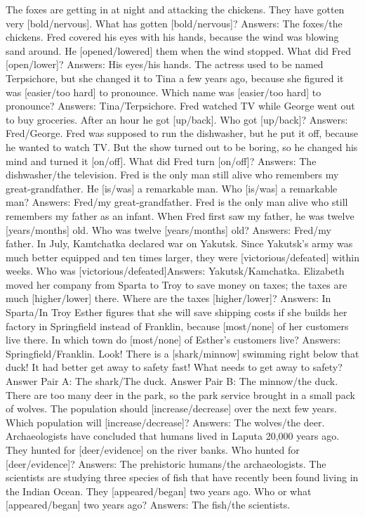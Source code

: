 \begin{foo}
The foxes are getting in at night and attacking the chickens. They have gotten very [bold/nervous]. What has gotten [bold/nervous]? Answers: The foxes/the chickens.
Fred covered his eyes with his hands, because the wind was blowing sand around. He [opened/lowered] them when the wind stopped. What did Fred [open/lower]? Answers: His eyes/his hands.
The actress used to be named Terpsichore, but she changed it to Tina a few years ago, because she figured it was [easier/too hard] to pronounce. Which name was [easier/too hard] to pronounce? Answers: Tina/Terpsichore.
Fred watched TV while George went out to buy groceries. After an hour he got [up/back]. Who got [up/back]? Answers: Fred/George.
Fred was supposed to run the dishwasher, but he put it off, because he wanted to watch TV. But the show turned out to be boring, so he changed his mind and turned it [on/off]. What did Fred turn [on/off]? Answers: The dishwasher/the television.
Fred is the only man still alive who remembers my great-grandfather. He [is/was] a remarkable man. Who [is/was] a remarkable man? Answers: Fred/my great-grandfather.
Fred is the only man alive who still remembers my father as an infant. When Fred first saw my father, he was twelve [years/months] old. Who was twelve [years/months] old? Answers: Fred/my father.
In July, Kamtchatka declared war on Yakutsk. Since Yakutsk's army was much better equipped and ten times larger, they were [victorious/defeated] within weeks. Who was [victorious/defeated]Answers:  Yakutsk/Kamchatka.
Elizabeth moved her company from Sparta to Troy to save money on taxes; the taxes are much [higher/lower] there. Where are the taxes [higher/lower]? Answers: In Sparta/In Troy
Esther figures that she will save shipping costs if she builds her factory in Springfield instead of Franklin, because [most/none] of her customers live there. In which town do [most/none] of Esther's customers live? Answers: Springfield/Franklin.
Look! There is a [shark/minnow] swimming right below that duck! It had better get away to safety fast! What needs to get away to safety? Answer Pair A: The shark/The duck. Answer Pair B: The minnow/the duck.
There are too many deer in the park, so the park service brought in a small pack of wolves. The population should [increase/decrease] over the next few years. Which population will [increase/decrease]? Answers: The wolves/the deer.
Archaeologists have concluded that humans lived in Laputa 20,000 years ago. They hunted for [deer/evidence] on the river banks. Who hunted for [deer/evidence]? Answers: The prehistoric humans/the archaeologists.
The scientists are studying three species of fish that have recently been found living in the Indian Ocean. They [appeared/began] two years ago. Who or what [appeared/began] two years ago? Answers: The fish/the scientists.

\end{foo}

